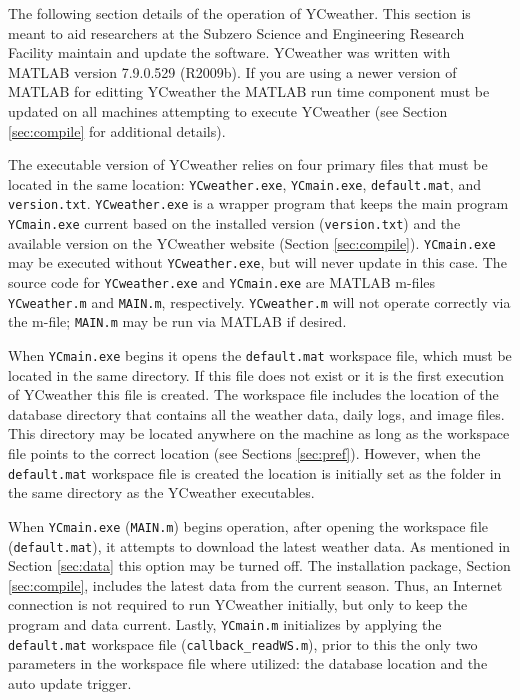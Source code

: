  \label{sec:advanced}
The following section details of the operation of YCweather.  This section is meant to aid researchers at the Subzero Science and Engineering Research Facility maintain and update the software.  YCweather was written with MATLAB version 7.9.0.529 (R2009b).  If you are using a newer version of MATLAB for editting YCweather the MATLAB run time component must be updated on all machines attempting to execute YCweather (see Section \ref{sec:compile} for additional details).

The executable version of YCweather relies on four primary files that must be located in the same location: \texttt{YCweather.exe}, \texttt{YCmain.exe}, \texttt{default.mat}, and \texttt{version.txt}.  \texttt{YCweather.exe} is a wrapper program that keeps the main program \texttt{YCmain.exe} current based on the installed version (\texttt{version.txt}) and the available version on the YCweather website (Section \ref{sec:compile}).  \texttt{YCmain.exe} may be executed without \texttt{YCweather.exe}, but will never update in this case.  The source code for \texttt{YCweather.exe} and \texttt{YCmain.exe} are MATLAB m-files \texttt{YCweather.m} and \texttt{MAIN.m}, respectively.  \texttt{YCweather.m} will not operate correctly via the m-file; \texttt{MAIN.m} may be run via MATLAB if desired.

When \texttt{YCmain.exe} begins it opens the \texttt{default.mat} workspace file, which must be located in the same directory.  If this file does not exist or it is the first execution of YCweather this file is created.  The workspace file includes the location of the database directory that contains all the weather data, daily logs, and image files.  This directory may be located anywhere on the machine as long as the workspace file points to the correct location (see Sections \ref{sec:pref}).  However, when the \texttt{default.mat} workspace file is created the location is initially set as the  folder in the same directory as the YCweather executables.

When \texttt{YCmain.exe} (\texttt{MAIN.m}) begins operation, after opening the workspace file (\texttt{default.mat}), it attempts to download the latest weather data.  As mentioned in Section \ref{sec:data} this option may be turned off.  The installation package, Section \ref{sec:compile}, includes the latest data from the current season.  Thus, an Internet connection is not required to run YCweather initially, but only to keep the program and data current.  Lastly, \texttt{YCmain.m} initializes by applying the \texttt{default.mat} workspace file (\texttt{callback\_readWS.m}), prior to this the only two parameters in the workspace file where utilized: the database location and the auto update trigger.

